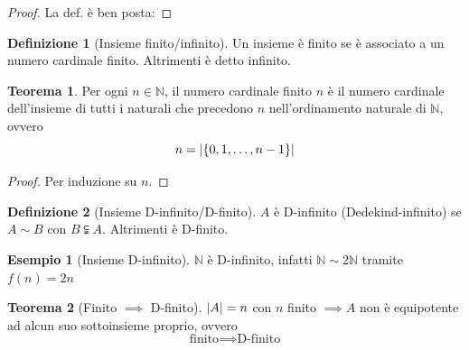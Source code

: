 \documentclass[a4paper,10pt]{article}
\theoremstyle{definition}
\newcommand{\na}{\mathbb{N}} %
\theoremstyle{indentdefinition}
\newtheorem{defn}{Definizione}[section]
\theoremstyle{indentpostulate}
\theoremstyle{indenttheorem}
\newtheorem{thm}{Teorema}[section]
\theoremstyle{myremark}
\newtheorem{example*}{Esempio}
\theoremstyle{indentgeneral}
\newenvironment{myboxed} 
{\noindent\begin{lrbox}{\mybox}\begin{minipage}{\textwidth}}
{\end{minipage}\end{lrbox}\fbox{\usebox{\mybox}}}
\begin{document}
\begin{proof}
    La def. è ben posta: 
\end{proof}

\begin{defn}[Insieme finito/infinito]
    Un insieme è finito se è associato a un numero cardinale finito. Altrimenti è detto infinito.
\end{defn}

\begin{thm}
    Per ogni $n\in\na$, il numero cardinale finito $n$ è il numero cardinale dell'insieme di tutti i naturali che precedono $n$ nell'ordinamento naturale di $\na$, ovvero $$n=\abs{\{0,1,\dots,n-1\}}$$
\end{thm}

\begin{proof}
    Per induzione su $n$.
\end{proof}

\begin{defn}[Insieme D-infinito/D-finito]
    $A$ è D-infinito (Dedekind-infinito) se $A\sim B$ con $B\subsetneqq A$. Altrimenti è D-finito.
\end{defn}

\begin{example*}[Insieme D-infinito]
    $\na$ è D-infinito, infatti $\na\sim2\na$ tramite $f(n)=2n$
\end{example*}

\begin{myboxed}
    \begin{thm}[Finito $\implies$ D-finito]
    $\abs{A}=n$ con $n$ finito $\implies A$ non è equipotente ad alcun suo sottoinsieme proprio, ovvero
    $$\text{finito}\implies\text{D-finito}$$
    \end{thm}
\end{myboxed}
\end{document}
